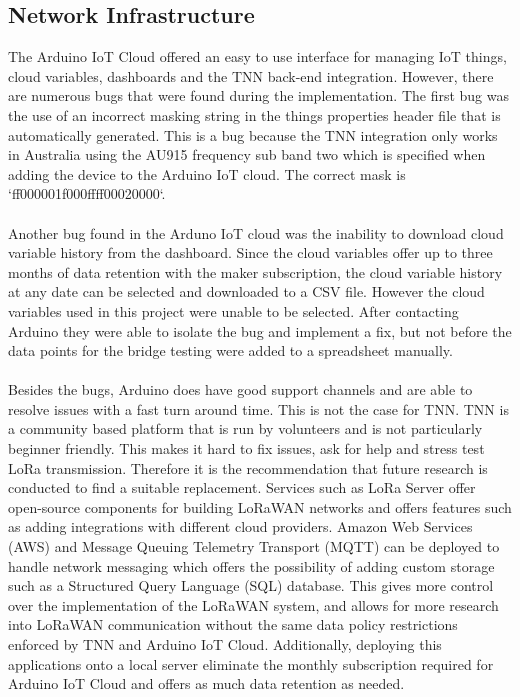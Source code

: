\subsection{Network Infrastructure}
The Arduino IoT Cloud offered an easy to use interface for managing IoT things, cloud variables, dashboards and the TNN back-end integration. However, there are numerous bugs that were found during the implementation. The first bug was the use of an incorrect masking string in the things properties header file that is automatically generated. This is a bug because the TNN integration only works in Australia using the AU915 frequency sub band two which is specified when adding the device to the Arduino IoT cloud. The correct mask is `ff000001f000ffff00020000`.\\\\
Another bug found in the Arduno IoT cloud was the inability to download cloud variable history from the dashboard. Since the cloud variables offer up to three months of data retention with the maker subscription, the cloud variable history at any date can be selected and downloaded to a CSV file. However the cloud variables used in this project were unable to be selected. After contacting Arduino they were able to isolate the bug and implement a fix, but not before the data points for the bridge testing were added to a spreadsheet manually.\\\\
Besides the bugs, Arduino does have good support channels and are able to resolve issues with a fast turn around time. This is not the case for TNN. TNN is a community based platform that is run by volunteers and is not particularly beginner friendly. This makes it hard to fix issues, ask for help and stress test LoRa transmission. Therefore it is the recommendation that future research is conducted to find a suitable replacement. Services such as LoRa Server offer open-source components for building LoRaWAN networks and offers features such as adding integrations with different cloud providers. Amazon Web Services (AWS) and Message Queuing Telemetry Transport (MQTT) can be deployed to handle network messaging which offers the possibility of adding custom storage such as a Structured Query Language (SQL) database. This gives more control over the implementation of the LoRaWAN system, and allows for more research into LoRaWAN communication without the same data policy restrictions enforced by TNN and Arduino IoT Cloud. Additionally, deploying this applications onto a local server eliminate the monthly subscription required for Arduino IoT Cloud and offers as much data retention as needed. 

